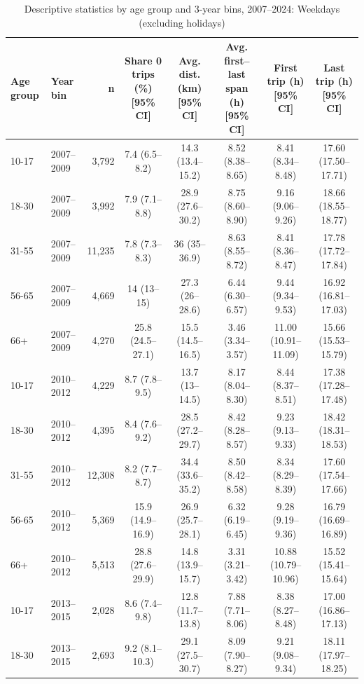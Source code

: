 \begin{table}[!htbp]
\centering
\begin{threeparttable}
\scriptsize
\caption{Descriptive statistics by age group and 3-year bins, 2007--2024: Weekdays (excluding holidays)}
\begin{tabular}{l l r c c c c c}
\toprule
\textbf{Age group} & \textbf{Year bin} & \textbf{n} & \textbf{Share 0 trips (\%) [95\% CI]} & \textbf{Avg. dist. (km) [95\% CI]} & \textbf{Avg. first--last span (h) [95\% CI]} & \textbf{First trip (h) [95\% CI]} & \textbf{Last trip (h) [95\% CI]} \\
\midrule
10-17 & 2007--2009 & 3,792 & 7.4 (6.5--8.2) & 14.3 (13.4--15.2) & 8.52 (8.38--8.65) & 8.41 (8.34--8.48) & 17.60 (17.50--17.71) \\
18-30 & 2007--2009 & 3,992 & 7.9 (7.1--8.8) & 28.9 (27.6--30.2) & 8.75 (8.60--8.90) & 9.16 (9.06--9.26) & 18.66 (18.55--18.77) \\
31-55 & 2007--2009 & 11,235 & 7.8 (7.3--8.3) & 36 (35--36.9) & 8.63 (8.55--8.72) & 8.41 (8.36--8.47) & 17.78 (17.72--17.84) \\
56-65 & 2007--2009 & 4,669 & 14 (13--15) & 27.3 (26--28.6) & 6.44 (6.30--6.57) & 9.44 (9.34--9.53) & 16.92 (16.81--17.03) \\
66+ & 2007--2009 & 4,270 & 25.8 (24.5--27.1) & 15.5 (14.5--16.5) & 3.46 (3.34--3.57) & 11.00 (10.91--11.09) & 15.66 (15.53--15.79) \\
10-17 & 2010--2012 & 4,229 & 8.7 (7.8--9.5) & 13.7 (13--14.5) & 8.17 (8.04--8.30) & 8.44 (8.37--8.51) & 17.38 (17.28--17.48) \\
18-30 & 2010--2012 & 4,395 & 8.4 (7.6--9.2) & 28.5 (27.2--29.7) & 8.42 (8.28--8.57) & 9.23 (9.13--9.33) & 18.42 (18.31--18.53) \\
31-55 & 2010--2012 & 12,308 & 8.2 (7.7--8.7) & 34.4 (33.6--35.2) & 8.50 (8.42--8.58) & 8.34 (8.29--8.39) & 17.60 (17.54--17.66) \\
56-65 & 2010--2012 & 5,369 & 15.9 (14.9--16.9) & 26.9 (25.7--28.1) & 6.32 (6.19--6.45) & 9.28 (9.19--9.36) & 16.79 (16.69--16.89) \\
66+ & 2010--2012 & 5,513 & 28.8 (27.6--29.9) & 14.8 (13.9--15.7) & 3.31 (3.21--3.42) & 10.88 (10.79--10.96) & 15.52 (15.41--15.64) \\
10-17 & 2013--2015 & 2,028 & 8.6 (7.4--9.8) & 12.8 (11.7--13.8) & 7.88 (7.71--8.06) & 8.38 (8.27--8.48) & 17.00 (16.86--17.13) \\
18-30 & 2013--2015 & 2,693 & 9.2 (8.1--10.3) & 29.1 (27.5--30.7) & 8.09 (7.90--8.27) & 9.21 (9.08--9.34) & 18.11 (17.97--18.25) \\

\end{tabular}
\end{threeparttable}
\end{table}
